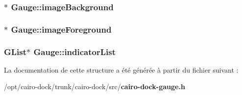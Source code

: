 \subsubsection{$\ast$ {\bf Gauge::imageBackground}}\label{structGauge_dea652e42dea8c8b0f079d2878975a47}


\subsubsection{$\ast$ {\bf Gauge::imageForeground}}\label{structGauge_40b0e0466403b09a3b10b397ad9ede7b}


\subsubsection{\setlength{\rightskip}{0pt plus 5cm}GList$\ast$ {\bf Gauge::indicatorList}}\label{structGauge_95776223387e2f27f854507046692096}




La documentation de cette structure a été générée à partir du fichier suivant :\begin{CompactItemize}
\item 
/opt/cairo-dock/trunk/cairo-dock/src/{\bf cairo-dock-gauge.h}\end{CompactItemize}
